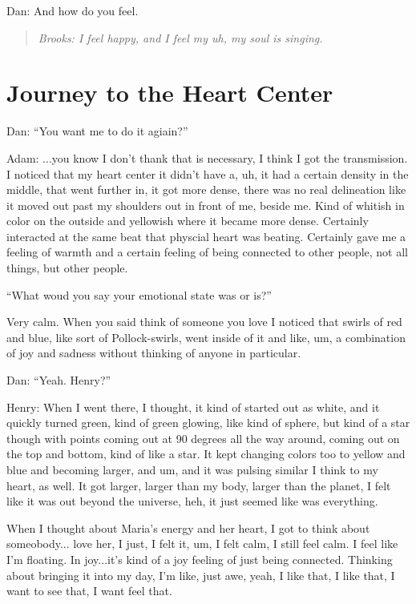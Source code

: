 \documentclass[12pt]{book}
\begin{document}
Dan: And how do you feel.

\begin{quote}{\em
Brooks: I feel happy, and I feel my uh, my soul is singing.
}\end{quote}    

\section{Journey to the Heart Center}

Dan: ``You want me to do it agiain?''

Adam: ...you know I don't thank that is necessary, I think I got the transmission.
I noticed that my heart center it didn't have a, uh, it had a
certain density in the middle, that went further in, it got more dense,
there was no real delineation like it moved out past my shoulders
out in front of me, beside me.
Kind of whitish in color on the outside and yellowish where it became more
dense. Certainly interacted at the same beat that physcial heart was
beating. Certainly gave me a feeling of warmth and a certain feeling of being
connected to other people, not all things, but other people.

``What woud you say your emotional state was or is?''

Very calm. When you said think of someone you love I noticed
that swirls of red and blue, like sort of Pollock-swirls,
went inside of it and like, um, a combination of joy and
sadness without thinking of anyone in particular.

Dan: ``Yeah. Henry?''

Henry: When I went there, I thought, it kind of started out as white,
and it quickly turned green, kind of green glowing, like kind
of sphere, but kind of a star though with points coming out at
90 degrees all the way around,  coming out on the top and bottom, kind of like a star.
It kept changing colors too to yellow and blue and becoming larger, and um,
and it was pulsing similar I think to my heart, as well. It got larger,
larger than my body, larger than the planet, I felt like it was out
beyond the universe, heh, it just seemed like was everything.

When I thought about Maria's energy and her heart, I got to think about someobody...
love her, I just,  I felt it, um, I felt calm, I still feel calm. I feel like I'm floating.
In joy...it's kind of a joy feeling of just being connected. Thinking about bringing it
into my day, I'm like, just awe, yeah, I like that, I like that, I want to see that, I want feel that.
\end{document}

